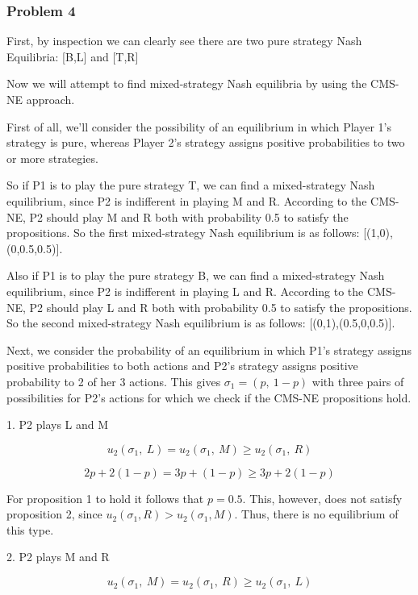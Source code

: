 \documentclass[a4paper]{article}
\begin{document}
\subsubsection{Problem 4}\label{problem4}

First, by inspection we can clearly see there are two pure strategy Nash
Equilibria: {[}B,L{]} and {[}T,R{]}

Now we will attempt to find mixed-strategy Nash equilibria by using the
CMS-NE approach.

First of all, we'll consider the possibility of an equilibrium in which
Player 1's strategy is pure, whereas Player 2's strategy assigns
positive probabilities to two or more strategies.

So if P1 is to play the pure strategy T, we can find a mixed-strategy
Nash equilibrium, since P2 is indifferent in playing M and R. According
to the CMS-NE, P2 should play M and R both with probability 0.5 to
satisfy the propositions. So the first mixed-strategy Nash equilibrium
is as follows: {[}(1,0),(0,0.5,0.5){]}.

Also if P1 is to play the pure strategy B, we can find a mixed-strategy
Nash equilibrium, since P2 is indifferent in playing L and R. According
to the CMS-NE, P2 should play L and R both with probability 0.5 to
satisfy the propositions. So the second mixed-strategy Nash equilibrium
is as follows: {[}(0,1),(0.5,0,0.5){]}.

Next, we consider the probability of an equilibrium in which P1's
strategy assigns positive probabilities to both actions and P2's
strategy assigns positive probability to 2 of her 3 actions. This gives
\(\sigma_{1} = (p,\ 1 - p)\) with three pairs of possibilities for P2's
actions for which we check if the CMS-NE propositions hold.

1. P2 plays L and M

\[u_{2}\left( \sigma_{1},\ L \right) = u_{2}\left( \sigma_{1},\ M \right) \geq u_{2}(\sigma_{1},\ R)\]

\[2p + 2\left( 1 - p \right) = 3p + \left( 1 - p \right) \geq 3p + 2\left( 1 - p \right)\]

For proposition 1 to hold it follows that \(p = 0.5\). This, however,
does not satisfy proposition 2, since
\(u_{2}\left( \sigma_{1},R \right) > u_{2}(\sigma_{1},M)\). Thus, there
is no equilibrium of this type.

2. P2 plays M and R

\[u_{2}\left( \sigma_{1},\ M \right) = u_{2}\left( \sigma_{1},\ R \right) \geq u_{2}(\sigma_{1},\ L)\]
\end{document}
